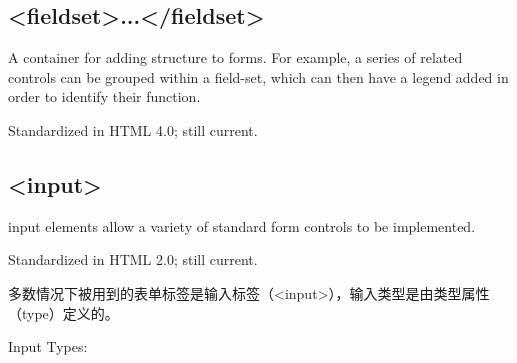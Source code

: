 \subsection{<fieldset>...</fieldset>}

A container for adding structure to forms. For example, a series of related controls can be grouped within a field-set, which can then have a legend added in order to identify their function.

Standardized in HTML 4.0; still current.


\subsection{<input>}

input elements allow a variety of standard form controls to be implemented.

Standardized in HTML 2.0; still current.

多数情况下被用到的表单标签是输入标签（<input>），输入类型是由类型属性（type）定义的。

Input Types:

